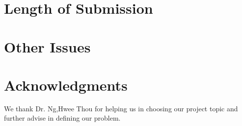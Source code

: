 \documentclass[11pt]{article}
\begin{document}
\section{Length of Submission}
\label{sec:length}

\section{Other Issues}


\section*{Acknowledgments}
We thank Dr. Ng,Hwee Thou for helping us in choosing our project topic and further 
advise in defining our problem.




\end{document}
